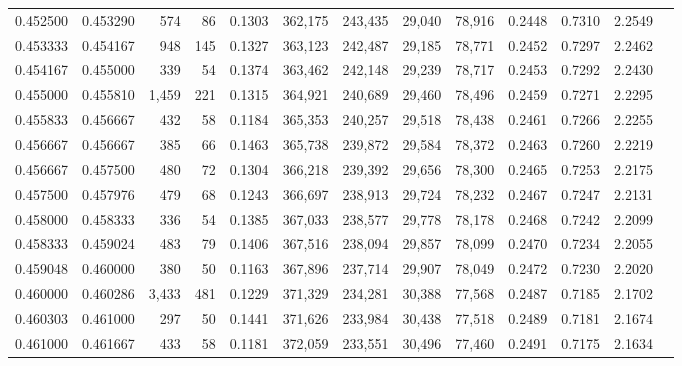 \begin{tabular}{rrrrrrrrrrrrr}
0.452500 & 0.453290 &   574 &  86 &                                     0.1303 & 362,175 & 243,435 &  29,040 &  78,916 & 0.2448 & 0.7310 & 2.2549 \\
0.453333 & 0.454167 &   948 & 145 &                                     0.1327 & 363,123 & 242,487 &  29,185 &  78,771 & 0.2452 & 0.7297 & 2.2462 \\
0.454167 & 0.455000 &   339 &  54 &                                     0.1374 & 363,462 & 242,148 &  29,239 &  78,717 & 0.2453 & 0.7292 & 2.2430 \\
0.455000 & 0.455810 & 1,459 & 221 &                                     0.1315 & 364,921 & 240,689 &  29,460 &  78,496 & 0.2459 & 0.7271 & 2.2295 \\
0.455833 & 0.456667 &   432 &  58 &                                     0.1184 & 365,353 & 240,257 &  29,518 &  78,438 & 0.2461 & 0.7266 & 2.2255 \\
0.456667 & 0.456667 &   385 &  66 &                                     0.1463 & 365,738 & 239,872 &  29,584 &  78,372 & 0.2463 & 0.7260 & 2.2219 \\
0.456667 & 0.457500 &   480 &  72 &                                     0.1304 & 366,218 & 239,392 &  29,656 &  78,300 & 0.2465 & 0.7253 & 2.2175 \\
0.457500 & 0.457976 &   479 &  68 &                                     0.1243 & 366,697 & 238,913 &  29,724 &  78,232 & 0.2467 & 0.7247 & 2.2131 \\
0.458000 & 0.458333 &   336 &  54 &                                     0.1385 & 367,033 & 238,577 &  29,778 &  78,178 & 0.2468 & 0.7242 & 2.2099 \\
0.458333 & 0.459024 &   483 &  79 &                                     0.1406 & 367,516 & 238,094 &  29,857 &  78,099 & 0.2470 & 0.7234 & 2.2055 \\
0.459048 & 0.460000 &   380 &  50 &                                     0.1163 & 367,896 & 237,714 &  29,907 &  78,049 & 0.2472 & 0.7230 & 2.2020 \\
0.460000 & 0.460286 & 3,433 & 481 &                                     0.1229 & 371,329 & 234,281 &  30,388 &  77,568 & 0.2487 & 0.7185 & 2.1702 \\
0.460303 & 0.461000 &   297 &  50 &                                     0.1441 & 371,626 & 233,984 &  30,438 &  77,518 & 0.2489 & 0.7181 & 2.1674 \\
0.461000 & 0.461667 &   433 &  58 &                                     0.1181 & 372,059 & 233,551 &  30,496 &  77,460 & 0.2491 & 0.7175 & 2.1634 \\

\end{tabular}
